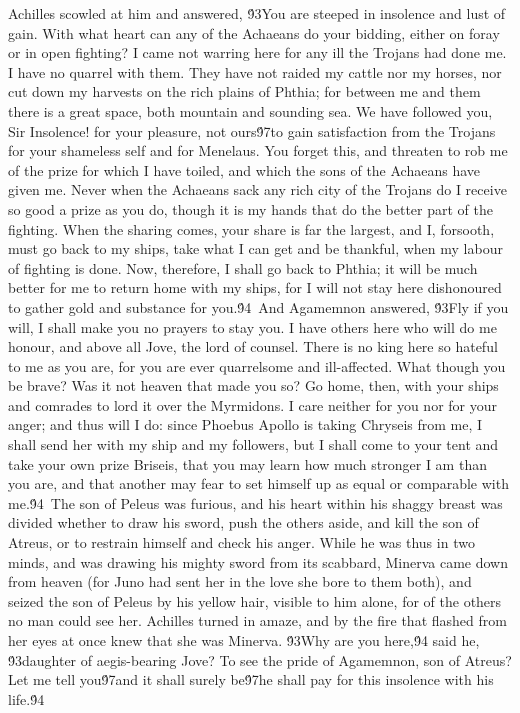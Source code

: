 {Achilles scowled at him and answered, \'93You are steeped in insolence and lust of gain. With what heart can any of the Achaeans do your bidding, either on foray or in open fighting? I came not warring here for any ill the Trojans had done me. I have no quarrel with them. They have not raided my cattle nor my horses, nor cut down my harvests on the rich plains of Phthia; for between me and them there is a great space, both mountain and sounding sea. We have followed you, Sir Insolence! for your pleasure, not ours\'97to gain satisfaction from the Trojans for your shameless self and for Menelaus. You forget this, and threaten to rob me of the prize for which I have toiled, and which the sons of the Achaeans have given me. Never when the Achaeans sack any rich city of the Trojans do I receive so good a prize as you do, though it is my hands that do the better part of the fighting. When the sharing comes, your share is far the largest, and I, forsooth, must go back to my ships, take what I can get and be thankful, when my labour of fighting is done. Now, therefore, I shall go back to Phthia; it will be much better for me to return home with my ships, for I will not stay here dishonoured to gather gold and substance for you.\'94\
And Agamemnon answered, \'93Fly if you will, I shall make you no prayers to stay you. I have others here who will do me honour, and above all Jove, the lord of counsel. There is no king here so hateful to me as you are, for you are ever quarrelsome and ill-affected. What though you be brave? Was it not heaven that made you so? Go home, then, with your ships and comrades to lord it over the Myrmidons. I care neither for you nor for your anger; and thus will I do: since Phoebus Apollo is taking Chryseis from me, I shall send her with my ship and my followers, but I shall come to your tent and take your own prize Briseis, that you may learn how much stronger I am than you are, and that another may fear to set himself up as equal or comparable with me.\'94\
The son of Peleus was furious, and his heart within his shaggy breast was divided whether to draw his sword, push the others aside, and kill the son of Atreus, or to restrain himself and check his anger. While he was thus in two minds, and was drawing his mighty sword from its scabbard, Minerva came down from heaven (for Juno had sent her in the love she bore to them both), and seized the son of Peleus by his yellow hair, visible to him alone, for of the others no man could see her. Achilles turned in amaze, and by the fire that flashed from her eyes at once knew that she was Minerva. \'93Why are you here,\'94 said he, \'93daughter of aegis-bearing Jove? To see the pride of Agamemnon, son of Atreus? Let me tell you\'97and it shall surely be\'97he shall pay for this insolence with his life.\'94\
}
